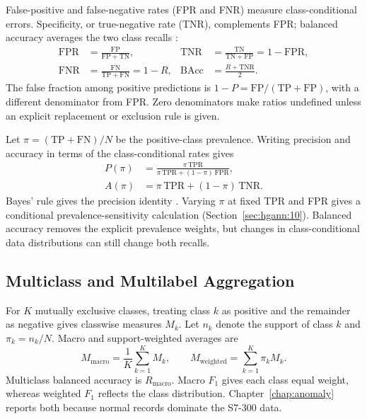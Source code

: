 False-positive and false-negative rates (FPR and FNR) measure class-conditional errors.
Specificity, or true-negative rate (TNR), complements FPR; balanced accuracy averages the two class recalls
\cite{fawcett2006roc,grandini2020metrics}:
\begin{equation}
  \begin{aligned}
    \mathrm{FPR}&=\frac{\mathrm{FP}}{\mathrm{FP}+\mathrm{TN}},
    &\mathrm{TNR}&=\frac{\mathrm{TN}}{\mathrm{TN}+\mathrm{FP}}=1-\mathrm{FPR},\\
    \mathrm{FNR}&=\frac{\mathrm{FN}}{\mathrm{TP}+\mathrm{FN}}=1-R,
    &\mathrm{BAcc}&=\frac{R+\mathrm{TNR}}{2}.
  \end{aligned}
  \label{eq:background:error-rates}
\end{equation}
The false fraction among positive predictions is $1-P=\mathrm{FP}/(\mathrm{TP}+\mathrm{FP})$,
with a different denominator from FPR. Zero denominators make ratios undefined unless an
explicit replacement or exclusion rule is given.

Let $\pi=(\mathrm{TP}+\mathrm{FN})/N$ be the positive-class prevalence. Writing precision and
accuracy in terms of the class-conditional rates gives
\begin{equation}
  \begin{aligned}
    P(\pi)&=\frac{\pi\,\mathrm{TPR}}
      {\pi\,\mathrm{TPR}+(1-\pi)\,\mathrm{FPR}},\\
    A(\pi)&=\pi\,\mathrm{TPR}+(1-\pi)\,\mathrm{TNR}.
  \end{aligned}
  \label{eq:background:prevalence}
\end{equation}
Bayes' rule gives the precision identity \cite{axelsson2000base}. Varying $\pi$ at fixed TPR
and FPR gives a conditional prevalence-sensitivity calculation (Section~\ref{sec:hgann:10}).
Balanced accuracy removes the explicit prevalence weights, but changes in class-conditional
data distributions can still change both recalls.

\subsection{Multiclass and Multilabel Aggregation}
\label{sec:background:metrics:aggregation}

For $K$ mutually exclusive classes, treating class $k$ as positive and the remainder as
negative gives classwise measures $M_k$. Let $n_k$ denote the support of class $k$ and
$\pi_k=n_k/N$. Macro and support-weighted averages are
\begin{equation}
  M_{\mathrm{macro}}=\frac1K\sum_{k=1}^{K}M_k,
  \qquad
  M_{\mathrm{weighted}}=\sum_{k=1}^{K}\pi_k M_k.
  \label{eq:background:class-averages}
\end{equation}
Multiclass balanced accuracy is $R_{\mathrm{macro}}$. Macro $F_1$ gives each class equal
weight, whereas weighted $F_1$ reflects the class distribution. Chapter~\ref{chap:anomaly}
reports both because normal records dominate the S7-300 data.

